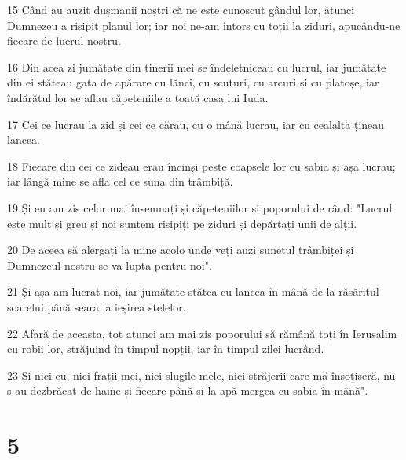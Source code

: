 \par 15 Când au auzit dușmanii noștri că ne este cunoscut gândul lor, atunci Dumnezeu a risipit planul lor; iar noi ne-am întors cu toții la ziduri, apucându-ne fiecare de lucrul nostru.
\par 16 Din acea zi jumătate din tinerii mei se îndeletniceau cu lucrul, iar jumătate din ei stăteau gata de apărare cu lănci, cu scuturi, cu arcuri și cu platoșe, iar îndărătul lor se aflau căpeteniile a toată casa lui Iuda.
\par 17 Cei ce lucrau la zid și cei ce cărau, cu o mână lucrau, iar cu cealaltă țineau lancea.
\par 18 Fiecare din cei ce zideau erau încinși peste coapsele lor cu sabia și așa lucrau; iar lângă mine se afla cel ce suna din trâmbiță.
\par 19 Și eu am zis celor mai însemnați și căpeteniilor și poporului de rând: "Lucrul este mult și greu și noi suntem risipiți pe ziduri și depărtați unii de alții.
\par 20 De aceea să alergați la mine acolo unde veți auzi sunetul trâmbiței și Dumnezeul nostru se va lupta pentru noi".
\par 21 Și așa am lucrat noi, iar jumătate stătea cu lancea în mână de la răsăritul soarelui până seara la ieșirea stelelor.
\par 22 Afară de aceasta, tot atunci am mai zis poporului să rămână toți în Ierusalim cu robii lor, străjuind în timpul nopții, iar în timpul zilei lucrând.
\par 23 Și nici eu, nici frații mei, nici slugile mele, nici străjerii care mă însoțiseră, nu s-au dezbrăcat de haine și fiecare până și la apă mergea cu sabia în mână".

\chapter{5}

